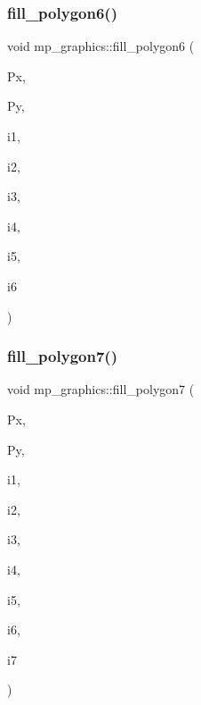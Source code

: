 \subsubsection{\texorpdfstring{fill\+\_\+polygon6()}{fill\_polygon6()}}
{\footnotesize\ttfamily void mp\+\_\+graphics\+::fill\+\_\+polygon6 (\begin{DoxyParamCaption}\item[{\mbox{\hyperlink{galois_8h_a09fddde158a3a20bd2dcadb609de11dc}{I\+NT}} $\ast$}]{Px,  }\item[{\mbox{\hyperlink{galois_8h_a09fddde158a3a20bd2dcadb609de11dc}{I\+NT}} $\ast$}]{Py,  }\item[{\mbox{\hyperlink{galois_8h_a09fddde158a3a20bd2dcadb609de11dc}{I\+NT}}}]{i1,  }\item[{\mbox{\hyperlink{galois_8h_a09fddde158a3a20bd2dcadb609de11dc}{I\+NT}}}]{i2,  }\item[{\mbox{\hyperlink{galois_8h_a09fddde158a3a20bd2dcadb609de11dc}{I\+NT}}}]{i3,  }\item[{\mbox{\hyperlink{galois_8h_a09fddde158a3a20bd2dcadb609de11dc}{I\+NT}}}]{i4,  }\item[{\mbox{\hyperlink{galois_8h_a09fddde158a3a20bd2dcadb609de11dc}{I\+NT}}}]{i5,  }\item[{\mbox{\hyperlink{galois_8h_a09fddde158a3a20bd2dcadb609de11dc}{I\+NT}}}]{i6 }\end{DoxyParamCaption})}

\mbox{\label{classmp__graphics_a574f077d9b2bc551e259050d3b5f0486}} 
\subsubsection{\texorpdfstring{fill\+\_\+polygon7()}{fill\_polygon7()}}
{\footnotesize\ttfamily void mp\+\_\+graphics\+::fill\+\_\+polygon7 (\begin{DoxyParamCaption}\item[{\mbox{\hyperlink{galois_8h_a09fddde158a3a20bd2dcadb609de11dc}{I\+NT}} $\ast$}]{Px,  }\item[{\mbox{\hyperlink{galois_8h_a09fddde158a3a20bd2dcadb609de11dc}{I\+NT}} $\ast$}]{Py,  }\item[{\mbox{\hyperlink{galois_8h_a09fddde158a3a20bd2dcadb609de11dc}{I\+NT}}}]{i1,  }\item[{\mbox{\hyperlink{galois_8h_a09fddde158a3a20bd2dcadb609de11dc}{I\+NT}}}]{i2,  }\item[{\mbox{\hyperlink{galois_8h_a09fddde158a3a20bd2dcadb609de11dc}{I\+NT}}}]{i3,  }\item[{\mbox{\hyperlink{galois_8h_a09fddde158a3a20bd2dcadb609de11dc}{I\+NT}}}]{i4,  }\item[{\mbox{\hyperlink{galois_8h_a09fddde158a3a20bd2dcadb609de11dc}{I\+NT}}}]{i5,  }\item[{\mbox{\hyperlink{galois_8h_a09fddde158a3a20bd2dcadb609de11dc}{I\+NT}}}]{i6,  }\item[{\mbox{\hyperlink{galois_8h_a09fddde158a3a20bd2dcadb609de11dc}{I\+NT}}}]{i7 }\end{DoxyParamCaption})}

